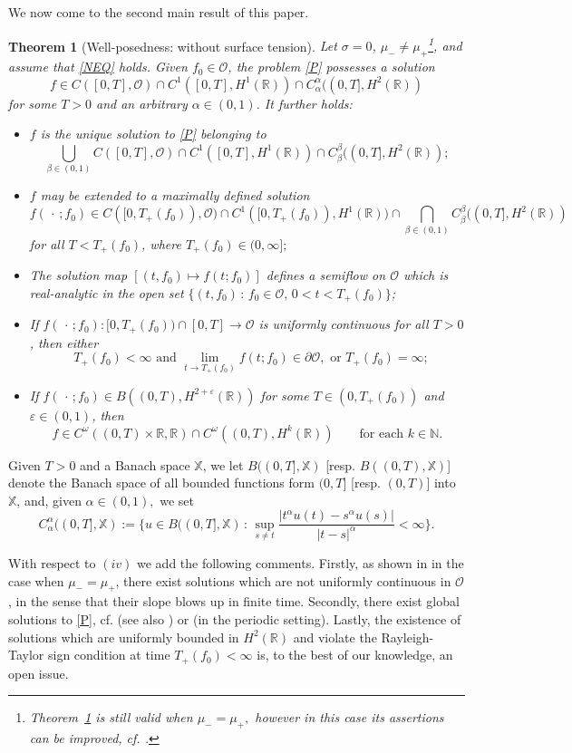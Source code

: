 \documentclass[11pt,reqno]{amsart}
\numberwithin{equation}{section}
\newcommand{\0}{\Omega}
\newcommand{\e}{\varepsilon}
\newcommand{\p}{\partial}
\newcommand{\bX}{\mathbb{X}}
\newcommand{\cO}{\mathcal{O}}
\newcommand{\R}{\mathbb{R}}
\newcommand{\N}{\mathbb{N}}
\newtheorem{thm}{Theorem}[section]
\numberwithin{equation}{section}
\begin{document}
 
We  now come to the second main result of this paper.
 \begin{thm}[Well-posedness: without surface tension]\label{MT2}
Let $\sigma=0$, $\mu_-\neq\mu_+$\footnote{Theorem~\ref{MT2} is still valid when $\mu_-=\mu_+,$ however in this case its assertions can be improved, cf.  \cite[Theorem~1.1]{M16x}.}, and assume that \eqref{NEQ} holds.
Given $f_0\in\cO$, the  problem \eqref{P} possesses  a   solution
\[ f\in C([0,T],\cO)\cap C^1([0,T], H^1(\R))\cap C^{\alpha}_{\alpha}((0,T], H^2(\R)) \] 
for some $T>0$ and an arbitrary  $\alpha\in(0,1)$.
It further holds:
\begin{itemize}
 \item[$(i)$] $f$ is the unique solution to \eqref{P} belonging to 
 \[\bigcup_{\beta\in(0,1)} C([0,T],\cO)\cap C^1([0,T], H^1(\R))\cap C^{\beta}_{\beta}((0,T], H^2(\R));\]
 \item[$(ii)$] $f$ may be extended to a maximally defined solution 
 $$f(\,\cdot\,; f_0)\in C([0,T_+(f_0)),\cO)\cap C^1([0,T_+(f_0)), H^1(\R))\cap \bigcap_{\beta\in(0,1)}C^{\beta}_{\beta}((0,T], H^2(\R))$$
 for all $T<T_+(f_0)$, where $T_+(f_0)\in (0,\infty];$
 \item[$(iii)$] The solution map   $[(t,f_0)\mapsto f(t;f_0)]$ defines a  semiflow on $\cO$ which is real-analytic in the open set $\{(t,f_0)\,:\, f_0\in\cO,\, 0<t<T_+(f_0)\}$;
 \item[$(iv)$] If $f(\,\cdot\,; f_0):[0,T_+(f_0))\cap[0,T]\to\cO$ is uniformly continuous for all $T>0$, then either
 \[\text{ $T_+(f_0)<\infty$ and $\lim_{t\to T_+(f_0)} f(t;f_0)\in\p\cO,$ or $T_+(f_0)=\infty;$}\]
 \item[$(v)$] If $f(\,\cdot\,; f_0)\in B((0,T), H^{2+\e}(\R))$ for some $T\in(0,T_+(f_0))$ and $\e\in(0,1)$, then 
 \[
 f\in C^\omega((0,T)\times\R,\R)\cap C^\omega ((0,T), H^k(\R))\qquad\text{for each $k\in\N.$}
 \]  
\end{itemize}
 \end{thm}
 Given $T>0$  and a Banach space $\bX$, we  let $B((0,T], \bX)$ [resp. $B((0,T), \bX)$] denote the Banach space of all bounded functions form $(0,T]$ [resp. $(0,T)$] into $\bX$, and, given  $\alpha\in(0,1),$ we set 
 \[
 C^\alpha_\alpha((0,T], \bX):=\Big\{u\in B((0,T], \bX)\,:\, \sup_{s\neq t}\frac{|t^\alpha u(t)-s^\alpha u(s)|}{|t-s|^\alpha}<\infty\Big\}.
 \]
 
With respect to $(iv)$  we add the following comments. Firstly,  as shown in \cite[Theorem~1.1]{CCFGL12} in the case when $\mu_-=\mu_+$, there exist solutions which are not uniformly continuous in $\cO$, 
in the sense that their slope blows up in finite time.
Secondly, there exist global solutions to \eqref{P}, cf.  \cite[Theorem~3.1]{CCGS13} (see also \cite[Corollary~1.4]{M16x}) or \cite[Theorem 2.2]{BCS16} (in the periodic setting).
Lastly, the existence of solutions which are uniformly bounded in $H^2(\R)$ and violate the Rayleigh-Taylor sign condition at time $T_+(f_0)<\infty$   is, to the best of our knowledge,  an open issue. 
\end{document}
